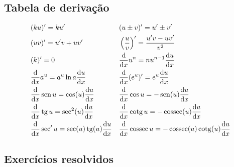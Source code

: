 \subsection{Tabela de derivação}

\begin{align*}
  & (ku)' = ku' && (u\pm v)' = u' \pm v'\\
  & (uv)' = u'v + uv' && \left(\frac{u}{v}\right)' = \frac{u'v - uv'}{v^2} \\
  & (k)' = 0 && \frac{\mathrm{d}}{\mathrm{d} x}u^n = nu^{n-1}\frac{\mathrm{d} u}{\mathrm{d} x}\\
  & \frac{\mathrm{d}}{\mathrm{d} x}a^u = a^u\ln a\frac{\mathrm{d} u}{\mathrm{d} x} && \frac{\mathrm{d}}{\mathrm{d} x}(e^u)' = e^u\frac{\mathrm{d} u}{\mathrm{d} x} \\
  & \frac{\mathrm{d}}{\mathrm{d} x}\operatorname{sen} u = \cos(u)\frac{\mathrm{d} u}{\mathrm{d} x} && \frac{\mathrm{d}}{\mathrm{d} x}\cos u = - \operatorname{sen}(u)\frac{\mathrm{d} u}{\mathrm{d} x}\\
  & \frac{\mathrm{d}}{\mathrm{d} x}\operatorname{tg} u = \sec^2(u)\frac{\mathrm{d} u}{\mathrm{d} x} && \frac{\mathrm{d}}{\mathrm{d} x}\operatorname{cotg} u = -\operatorname{cossec}(u)\frac{\mathrm{d} u}{\mathrm{d} x} \\
  & \frac{\mathrm{d}}{\mathrm{d} x}\sec' u = \sec(u)\operatorname{tg}(u)\frac{\mathrm{d} u}{\mathrm{d} x} && \frac{\mathrm{d}}{\mathrm{d} x}\operatorname{cossec} u = -\operatorname{cossec}(u)\operatorname{cotg}(u)\frac{\mathrm{d} u}{\mathrm{d} x}
\end{align*}

\subsection*{Exercícios resolvidos}

\emconstrucao

